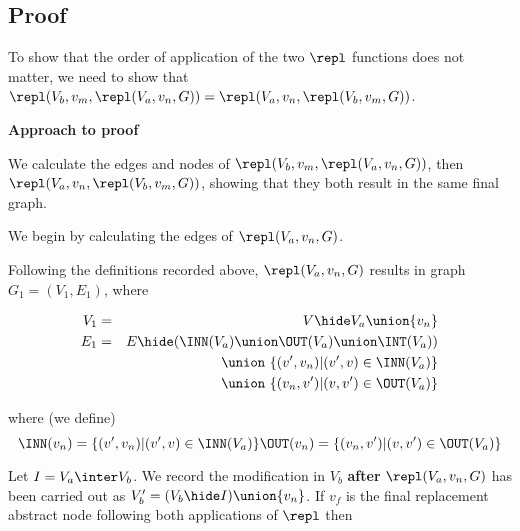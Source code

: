   
\subsection{Proof}

To show that  the order of application of the two $\repl$ functions does not matter,   we need to show that    $\repl(V_b,v_m,\repl(V_a,v_n,G)) = \repl(V_a,v_n,\repl(V_b,v_m,G))$.
  

{\bf Approach to proof}
\vspace{10pt}

We  calculate the edges and nodes of
$\repl(V_b,v_m,\repl(V_a,v_n,G))$, then
$\repl(V_a,v_n,\repl(V_b,v_m,G))$, 
showing that they both result in the same final graph.


We begin by calculating the edges of $\repl(V_a,v_n,G)$.

Following the definitions recorded above, $\repl(V_a,v_n,G)$ results in graph $G_1=(V_1,E_1)$, where

\begin{eqnarray*}
  V_1 & = & V\hide V_a \union \{v_n\}\\
  E_1 & = & E\hide ( \INN(V_a) \union \OUT(V_a) \union \INT(V_a)) \\
  && \union\ \{(v',v_{n})|(v',v) \in \INN(V_a) \}\\
  && \union\ \{(v_{n},v')|(v,v') \in \OUT(V_a) \}\\
\end{eqnarray*}

where (we define)
\[
\INN(v_n) = \{(v',v_n)|(v',v) \in \INN(V_a) \}\\
\OUT(v_n) = \{(v_n,v')|(v,v') \in \OUT(V_a) \}
\]

% 
\noindent  
Let $I = V_a \inter V_b$.  We record the modification in $V_b$ \textbf{after} $\repl(V_a,v_n,G)$ has been carried out as $V'_b = (V_b\hide I)\union\{v_{n}\}$.
If $v_f$ is the final replacement abstract node following both applications of $\repl$ then

